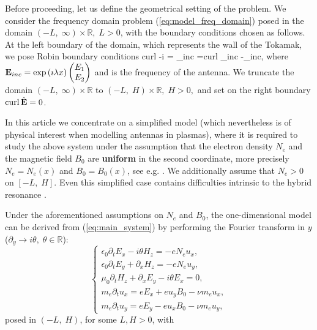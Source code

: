 {Before proceeding, let us define the geometrical setting of the problem. We consider the frequency domain problem (\ref{eq:model_freq_domain}) posed in the domain $(-L,\;\infty)\times\mathbb{R},\; L>0$, with the 
 boundary conditions chosen as follows. At the left boundary of the domain, which represents the wall of the Tokamak, we pose Robin boundary conditions 
\be
\label{eq:boundary_conditions_intro}
curl  -i \lambda{}\wedge \n = _{inc} =curl \E_{inc} -\imath\lambda\E_{inc}\wedge \n,
\ee
where ${\bf E}_{inc} = \exp \left(\imath \lambda x\right)\begin{pmatrix} E_1\\ E_2 \end{pmatrix}$ and  is 
the frequency of the antenna. We truncate the domain 
$(-L,\; \infty)\times\mathbb{R}$ to $(-L,\; H)\times\mathbb{R},\; H>0,$ and set on the right boundary $\operatorname{curl} \hat{{\bf E}} = 0$. 

In this article we concentrate on a simplified model (which nevertheless is of physical interest when modelling antennas in plasmas), 
where it is required to study the above system under the assumption that the electron density $N_{e}$ and the magnetic field $B_0$ are \textbf{uniform} in the second coordinate, more precisely 
$N_{e}=N_{e}(x)$ and $B_0=B_0(x)$, see e.g. \cite{Despres_2014}. 
We additionally assume that $N_e>0$ on $[-L,\;H]$. Even this simplified case contains difficulties intrinsic to the hybrid resonance \cite{Despres_2014, singular_solutions}. 

Under the aforementioned assumptions on $N_e$ and $B_0$, the one-dimensional model can be derived from (\ref{eq:main_system}) by performing the Fourier transform in $y$ ($\partial_y\rightarrow i\theta, \; \theta\in\mathbb{R}$):
\begin{equation}
 \label{eq:main_model}
\begin{cases}
\epsilon_0\partial_t E_{x}-i\theta H_z=-eN_e u_x,\\
\epsilon_0\partial_t E_{y}+\partial_x H_z=-eN_e u_y,\\
\mu_0\partial_t H_z+\partial_x E_y-i\theta E_x =0,\\
m_e\partial_t u_x=eE_x+eu_yB_0-\nu m_e u_x,\\
m_e\partial_t u_y=eE_y-eu_xB_0-\nu m_e u_y,
\end{cases}
\end{equation}
 posed in $(-L,\; H)$, for some $L,H>0$, with 


}
